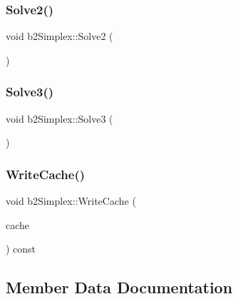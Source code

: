 \mbox{\label{structb2_simplex_a449fa9b3f63d7f49535dfe9767f1b9bd}} 
\subsubsection{\texorpdfstring{Solve2()}{Solve2()}}
{\footnotesize\ttfamily void b2\+Simplex\+::\+Solve2 (\begin{DoxyParamCaption}{ }\end{DoxyParamCaption})}

\mbox{\label{structb2_simplex_a7835361343a7388b8f15c94c8deb48c6}} 
\subsubsection{\texorpdfstring{Solve3()}{Solve3()}}
{\footnotesize\ttfamily void b2\+Simplex\+::\+Solve3 (\begin{DoxyParamCaption}{ }\end{DoxyParamCaption})}

\mbox{\label{structb2_simplex_a8161f17ee71e0620b63842a05776dd4b}} 
\subsubsection{\texorpdfstring{WriteCache()}{WriteCache()}}
{\footnotesize\ttfamily void b2\+Simplex\+::\+Write\+Cache (\begin{DoxyParamCaption}\item[{\mbox{\hyperlink{structb2_simplex_cache}{b2\+Simplex\+Cache}} $\ast$}]{cache }\end{DoxyParamCaption}) const\hspace{0.3cm}{\ttfamily [inline]}}



\subsection{Member Data Documentation}
\mbox{\label{structb2_simplex_ad11c352a25ee324f438515fb8028bd23}} 
